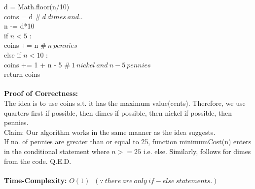 \documentclass{article}
\newcommand\tab[1][4mm]{\hspace*{#1}}
\begin{document}
\tab d = Math.floor(n/10) \\
\tab\tab coins = d $\#\ d\ dimes\ and ..$\\
\tab\tab n -= d*10 \\
\tab\tab if $n < 5$ : \\
\tab\tab\tab  coins += n $\#\ n\ pennies $\\ 
\tab\tab else if $n < 10$ : \\
\tab\tab\tab coins += 1 + n - 5 $\#\ 1\ nickel\ and\ n - 5\ pennies $ \\
\tab return coins \\
\vspace{0.5mm} \\
\textbf{Proof of Correctness:}\\
The idea is to use coins s.t. it has the maximum value(cents). Therefore, we use quarters first if possible, then dimes if possible, then nickel if possible, then pennies. \\
Claim: Our algorithm works in the same manner as the idea suggests. \\
If no. of pennies are greater than or equal to 25, function minimumCost(n) enters in the conditional statement where $n>=25$ i.e. else. Similarly, follows for dimes from the code. Q.E.D. \\
\vspace{1mm} \\
\textbf{Time-Complexity:} $O(1)\;\; (\because\ there\ are\ only\ if-else\ statements.) $
\end{document}
